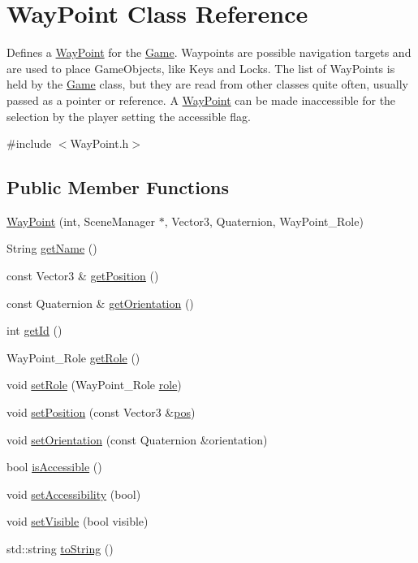\hypertarget{classWayPoint}{\section{\-Way\-Point \-Class \-Reference}
\label{classWayPoint}
}


\-Defines a \hyperlink{classWayPoint}{\-Way\-Point} for the \hyperlink{classGame}{\-Game}. \-Waypoints are possible navigation targets and are used to place \-Game\-Objects, like \-Keys and \-Locks. \-The list of \-Way\-Points is held by the \hyperlink{classGame}{\-Game} class, but they are read from other classes quite often, usually passed as a pointer or reference. \-A \hyperlink{classWayPoint}{\-Way\-Point} can be made inaccessible for the selection by the player setting the accessible flag.  




{\ttfamily \#include $<$\-Way\-Point.\-h$>$}

\subsection*{\-Public \-Member \-Functions}
\begin{DoxyCompactItemize}
\item 
\hyperlink{classWayPoint_a13644b20d0bf0ae35a3f0919b67f65aa}{\-Way\-Point} (int, \-Scene\-Manager $\ast$, \-Vector3, \-Quaternion, \-Way\-Point\-\_\-\-Role)
\item 
\-String \hyperlink{classWayPoint_afcbd6e620869ab00a36a36ac63d41e1a}{get\-Name} ()
\item 
const \-Vector3 \& \hyperlink{classWayPoint_a79327a4ecc81d6cabd5be1ea553474e3}{get\-Position} ()
\item 
const \-Quaternion \& \hyperlink{classWayPoint_aa89f93715f369c3be302b1c416ba5421}{get\-Orientation} ()
\item 
int \hyperlink{classWayPoint_a2c2c44621b047d3bdfdf4f0ee7e2566e}{get\-Id} ()
\item 
\-Way\-Point\-\_\-\-Role \hyperlink{classWayPoint_a52fd4b22dc0db0454ba891c799f1220c}{get\-Role} ()
\item 
void \hyperlink{classWayPoint_a6603a3e2950050021fb2af4f19b9cea1}{set\-Role} (\-Way\-Point\-\_\-\-Role \hyperlink{classWayPoint_aed5b54453c7dc642ee8125158942ccd0}{role})
\item 
void \hyperlink{classWayPoint_a58f2d2b3cf03026c34dc6cae2dbcf24e}{set\-Position} (const \-Vector3 \&\hyperlink{classWayPoint_aaace5c39e2b733295ef37de4228eb115}{pos})
\item 
void \hyperlink{classWayPoint_aef37a4697991dddae64f6b2bd7c1eb67}{set\-Orientation} (const \-Quaternion \&orientation)
\item 
bool \hyperlink{classWayPoint_aa6ea489c68a04bc8b4bbce8f30d470f4}{is\-Accessible} ()
\item 
void \hyperlink{classWayPoint_aaec82ed4514b47784e9e44b2becf8fc4}{set\-Accessibility} (bool)
\item 
void \hyperlink{classWayPoint_a7c3744470bb0733a8d027203def48925}{set\-Visible} (bool visible)
\item 
std\-::string \hyperlink{classWayPoint_adbda23a7d37cec525bd40e317c134b92}{to\-String} ()
\end{DoxyCompactItemize}
